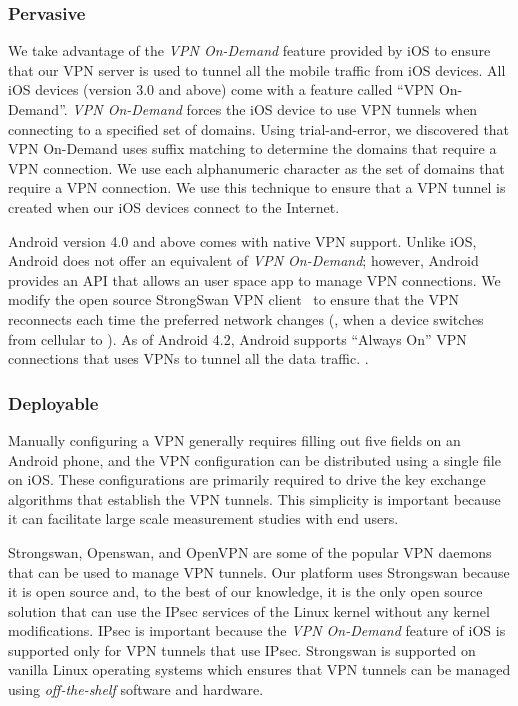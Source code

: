 \subsubsection{Pervasive}
We take advantage of the \emph{VPN On-Demand} feature provided by iOS to
ensure that our VPN server is used to tunnel all the mobile traffic from
iOS devices. All iOS devices (version 3.0 and above) come with a feature
called ``VPN On-Demand''. \emph{VPN On-Demand} forces the iOS device to use
VPN tunnels when connecting to a specified set of domains. Using
trial-and-error, we discovered that VPN On-Demand uses suffix matching to
determine the domains that require a VPN connection. We use each
alphanumeric character as the set of domains that require a VPN connection.
We use this technique to ensure that a VPN tunnel is created when our iOS
devices connect to the Internet. 

Android version 4.0 and above comes with native VPN support. Unlike iOS,
Android does not offer an equivalent of \emph{VPN On-Demand}; however,
Android provides an API that allows an user space app to  manage VPN
connections. We modify the open source StrongSwan VPN
client~\cite{strongswanclient} to ensure that the VPN reconnects each time
the preferred network changes (\eg, when a device switches from cellular to
\wifi). As of Android 4.2, Android supports ``Always On'' VPN connections
that uses VPNs to tunnel all the data traffic. .

\subsubsection{Deployable}
Manually configuring a VPN generally requires filling out five fields on an
Android phone, and the VPN configuration can be distributed using a single
file on iOS. These configurations are primarily required to drive the key
exchange algorithms that establish the VPN tunnels. This simplicity is
important because it can facilitate large scale measurement studies with
end users.  

Strongswan, Openswan, and OpenVPN are some of the popular VPN daemons that
can be used to manage VPN tunnels. Our platform uses Strongswan because it
is open source and, to the best of our knowledge, it is the only open
source solution that can use the IPsec services of the Linux kernel without
any kernel modifications. IPsec is important because the \emph{VPN
On-Demand} feature of iOS is supported only for VPN tunnels that use IPsec.
Strongswan is supported on vanilla Linux operating systems which ensures
that VPN tunnels can be managed using \emph{off-the-shelf} software and
hardware.


